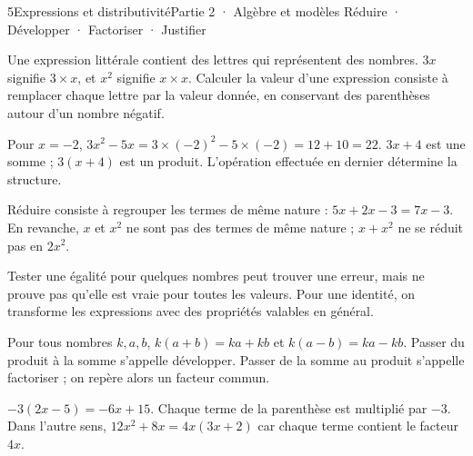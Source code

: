 \begin{ouverture}[calcul]{5}{Expressions et distributivité}{Partie 2 · Algèbre et modèles}
{Réduire · Développer · Factoriser · Justifier}
\end{ouverture}
\pagestyle{otMain}\essentiel\fontsize{11}{15}\selectfont
{}\label{cours-5-1}
\begin{definition}Une expression littérale contient des lettres qui représentent des nombres. $3x$ signifie $3\times x$, et $x^2$ signifie $x\times x$. Calculer la valeur d’une expression consiste à remplacer chaque lettre par la valeur donnée, en conservant des parenthèses autour d’un nombre négatif.\end{definition}
\begin{exemple}Pour $x=-2$, $3x^2-5x=3\times(-2)^2-5\times(-2)=12+10=22$. $3x+4$ est une somme ; $3(x+4)$ est un produit. L’opération effectuée en dernier détermine la structure.\end{exemple}
\begin{propriete}Réduire consiste à regrouper les termes de même nature : $5x+2x-3=7x-3$. En revanche, $x$ et $x^2$ ne sont pas des termes de même nature ; $x+x^2$ ne se réduit pas en $2x^2$.\end{propriete}
\begin{attention}Tester une égalité pour quelques nombres peut trouver une erreur, mais ne prouve pas qu’elle est vraie pour toutes les valeurs. Pour une identité, on transforme les expressions avec des propriétés valables en général.\end{attention}
\clearpage
{}\label{cours-5-2}
\begin{propriete}Pour tous nombres $k,a,b$, $k(a+b)=ka+kb$ et $k(a-b)=ka-kb$. Passer du produit à la somme s’appelle développer. Passer de la somme au produit s’appelle factoriser ; on repère alors un facteur commun.\end{propriete}
\begin{exemple}$-3(2x-5)=-6x+15$. Chaque terme de la parenthèse est multiplié par $-3$. Dans l’autre sens, $12x^2+8x=4x(3x+2)$ car chaque terme contient le facteur $4x$.\end{exemple}
\label{fig-cours-5-2-cours-distributivite}

